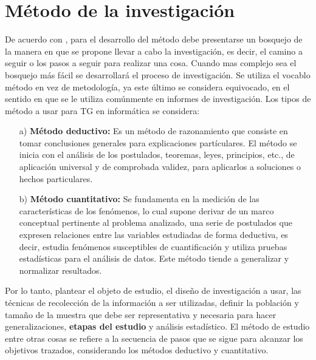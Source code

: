 \section{Método de la investigación}
De acuerdo con \cite{Erica}, para el desarrollo del método debe presentarse un bosquejo de la manera  en que se propone llevar a cabo la investigación, es decir, el camino a seguir o los pasos a seguir para realizar una cosa. Cuando mas complejo sea el bosquejo  más fácil se desarrollará el proceso de investigación. Se utiliza el vocablo método en vez de metodología, ya este último se considera equivocado, en el sentido en que se le utiliza comúnmente en informes de investigación. 
\vskip 0.3cm
Los tipos de método a usar para TG en informática se considera:
\begin{enumerate}
\item[a)] {\bf Método deductivo:} Es un método de razonamiento que consiste en tomar conclusiones generales para explicaciones partículares. El método se inicia con el análisis de los postulados, teoremas, leyes, principios, etc., de aplicación universal y de comprobada validez, para aplicarlos  a soluciones o hechos particulares. 

\item[b)]{\bf Método cuantitativo:} Se fundamenta en la medición de las características de los fenómenos, lo cual supone derivar de un marco conceptual pertinente al problema analizado, una serie de postulados que expresen relaciones entre las variables estudiadas de forma deductiva, es decir, estudia fenómenos susceptibles de cuantificación y utiliza pruebas estadísticas para el análisis de datos. Este método tiende a generalizar y normalizar resultados. 
\end{enumerate}

Por lo tanto, plantear el objeto de estudio, el diseño de investigación a usar, las técnicas de recolección de la información a ser utilizadas, definir la población y tamaño de la muestra que debe ser representativa y necesaria para hacer generalizaciones, {\bf etapas del estudio} y análisis estadístico. El método de estudio entre otras cosas se refiere a la secuencia de pasos que se sigue para alcanzar los objetivos trazados, considerando los métodos deductivo y cuantitativo.\par
\vskip 0.3cm





